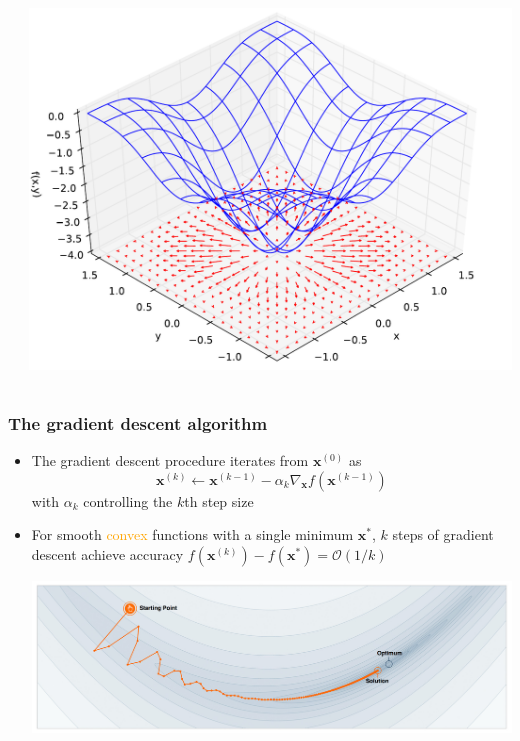 \documentclass[usenames,dvipsnames,aspectratio=169]{beamer}
\begin{document}
\begin{frame}
\begin{columns}
\begin{column}{0.5\textwidth}
\end{column}
\begin{column}{0.5\textwidth}  %
    \begin{center}
     \includegraphics[width=0.9\columnwidth]{linregr-gradient-visual.pdf}
     \end{center}
\end{column}
\end{columns}

\end{frame}



\begin{frame}
\frametitle{The gradient descent algorithm}

\begin{itemize}

\item The gradient descent procedure iterates from $\mathbf{x}^{(0)}$ as
\[
\mathbf{x}^{(k)} \leftarrow
\mathbf{x}^{(k-1)} - \alpha_k \nabla_{\mathbf{x}} f(\mathbf{x}^{(k-1)})
\]
with $\alpha_k$ controlling the $k$th step size

\pause 
\item For smooth \textcolor{orange}{convex} functions with a single minimum $\mathbf{x}^*$,
$k$ steps of gradient descent achieve accuracy 
$f(\mathbf{x}^{(k)}) - f(\mathbf{x}^*) = \mathcal{O}(1/k)$

\begin{center}
  \includegraphics[width=0.8\columnwidth]{gradient_descent.png}
\end{center}

\end{itemize}

\end{frame}
\end{document}
